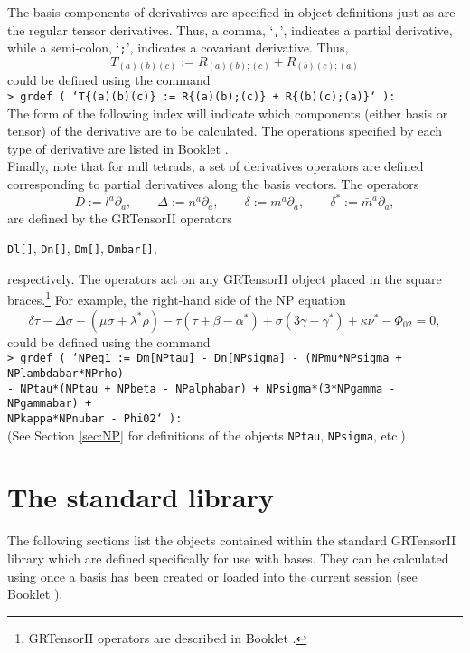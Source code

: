 \documentclass{article}
\begin{document}
The basis components of derivatives are specified in object
definitions just as are the regular tensor derivatives. Thus, a comma,
`\texttt{,}', indicates a partial derivative, while a semi-colon,
`\texttt{;}', indicates a covariant derivative. Thus,
\[
  T_{(a)(b)(c)} := R_{(a)(b);(c)} + R_{(b)(c);(a)}
\]
could be defined using the command\\

\noindent\texttt{> grdef (
  `T\{(a)(b)(c)\} := R\{(a)(b);(c)\} + R\{(b)(c);(a)\}` ):}\\

\noindent The form of the following index will indicate which 
components (either basis or tensor) of the derivative are to be
calculated. The operations specified by each type of derivative are
listed in Booklet \grDefRef.\\

Finally, note that for null tetrads, a set of derivatives operators
are defined corresponding to partial derivatives along the basis
vectors. The operators
\[
  D := l^a\partial_a, \qquad \Delta := n^a\partial_a, \qquad
  \delta := m^a\partial_a, \qquad \delta^* := \bar{m}^a\partial_a,
\]
are defined by the GRTensorII operators
\begin{center}
  \texttt{Dl[]}, \qquad \texttt{Dn[]}, \qquad \texttt{Dm[]}, \qquad
  \texttt{Dmbar[]},
\end{center}
respectively. The operators act on any GRTensorII object placed in
the square braces.\footnote{GRTensorII operators are described in
Booklet \grCalcRef.} For example, the right-hand side of the
NP equation
\[
  \delta\tau - \Delta\sigma - (\mu\sigma + \lambda^*\rho)
    - \tau (\tau+\beta-\alpha^*) + \sigma (3\gamma-\gamma^*)
    + \kappa\nu^* - \Phi_{02} = 0,
\]
could be defined using the command\\

\noindent\texttt{> grdef ( `NPeq1 := Dm[NPtau] - Dn[NPsigma]
  - (NPmu*NPsigma + NPlambdabar*NPrho) \\
  \indent - NPtau*(NPtau + NPbeta - NPalphabar)
  + NPsigma*(3*NPgamma - NPgammabar) + \\
  \indent NPkappa*NPnubar - Phi02` ):}\\

\noindent (See Section \ref{sec:NP} for definitions of the objects
\texttt{NPtau}, \texttt{NPsigma}, etc.)
%
\section{The standard library} \label{sec:lib}
%
The following sections list the objects contained within the standard
GRTensorII library which are defined specifically for use with bases.
They can be calculated using  once a basis has been
created or loaded into the current session (see Booklet \grMakegRef).
\end{document}

